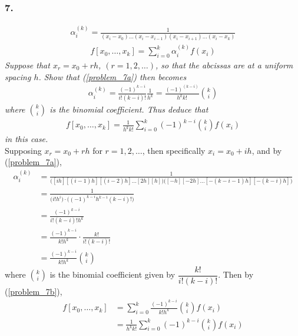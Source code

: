 \documentclass[12pt]{article}
\begin{document}
\subsubsection*{7.}

\begin{align}
\label{problem_7a}
\alpha_i^{(k)} = \frac{1}{(x_i - x_0)\dots(x_i - x_{i-1})(x_i - x_{i+1})\dots(x_i - x_k)}
\end{align}
\begin{align}
\label{problem_7b}
f[x_0, \dots, x_k] = \sum\limits_{i = 0}^{k}\alpha_i^{(k)}f(x_i)
\end{align}
{\it Suppose that $x_r = x_0 + rh$, $(r = 1, 2, \dots)$, so that the abcissas are at a uniform spacing $h$.  Show that (\ref{problem_7a}) then becomes}
\begin{align*}
\alpha_i^{(k)} = \frac{(-1)^{k-i}}{i!(k-i)!}\frac{1}{h^k} = \frac{(-1)^{(k-i)}}{h^{k}k!}\binom{k}{i}
\end{align*}
{\it where $\displaystyle\binom{k}{i}$ is the binomial coefficient.  Thus deduce that}
\begin{align}
\label{problem_7c}
f[x_0, \dots, x_k] = \frac{1}{h^{k}k!}\sum\limits_{i=0}^{k}(-1)^{k-i}\binom{k}{i}f(x_i)
\end{align}
{\it in this case.} \\

\noindent Supposing $x_r = x_0 + rh$ for $r = 1, 2, \dots$, then specifically $x_i  = x_0 + ih$, and by (\ref{problem_7a}),
\begin{align*}
\alpha_i^{(k)} &= \frac{1}{\Big([ih][(i-1)h][(i-2)h]\dots[2h][h]\Big)\Big([-h][-2h]\dots[-(k-i-1)h][-(k-i)h]\Big)} \\
&= \frac{1}{\Big(i!h^i\Big) \cdot \Big((-1)^{k-i} h^{k-i} (k-i)!\Big)} \\
&= \frac{(-1)^{k-i}}{i!(k-i)!h^k} \\
& = \frac{(-1)^{k-i}}{k!h^k}\cdot \frac{k!}{i!(k-i)!} \\
&= \frac{(-1)^{k-i}}{k!h^k}\binom{k}{i}
\end{align*}
where $\displaystyle\binom{k}{i}$ is the binomial coefficient given by $\dfrac{k!}{i!(k-i)! }$.  Then by (\ref{problem_7b}), 
\begin{align*}
f[x_0, \dots, x_k] &= \sum\limits_{i = 0}^{k}\frac{(-1)^{k-i}}{k!h^k}\binom{k}{i}f(x_i) \\
&= \frac{1}{h^{k}k!}\sum\limits_{i=0}^{k}(-1)^{k-i}\binom{k}{i}f(x_i)
\end{align*}
\end{document}
